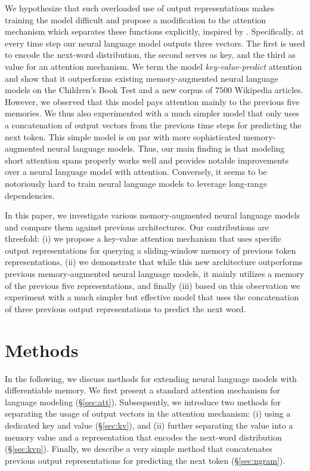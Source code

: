 \documentclass{article}
\begin{document}
We hypothesize that such overloaded use of output representations makes training the model difficult and propose a modification to the attention mechanism which separates these functions explicitly, inspired by \cite{MIL16, ba2016using, reed2015neural, gulcehre2016dynamic}.
Specifically, at every time step our neural language model outputs three vectors.
The first is used to encode the next-word distribution, the second serves as key, and the third as value for an attention mechanism.
We term the model \emph{key-value-predict} attention and show that it outperforms existing memory-augmented neural language models on the Children's Book Test \citep[CBT,][]{hill2015goldilocks} and a new corpus of $7500$ Wikipedia articles.
However, we observed that this model pays attention mainly to the previous five memories.
We thus also experimented with a much simpler model that only uses a concatenation of output vectors from the previous time steps for predicting the next token. 
This simple model is on par with more sophisticated memory-augmented neural language models.
Thus, our main finding is that modeling short attention spans properly works well and provides notable improvements over a neural language model with attention.
Conversely, it seems to be notoriously hard to train neural language models to leverage long-range dependencies.

In this paper, we investigate various memory-augmented neural language models and compare them against previous architectures.
Our contributions are threefold:
(i) we propose a key-value attention mechanism that uses specific output representations for querying a sliding-window memory of previous token representations,
(ii) we demonstrate that while this new architecture outperforms previous memory-augmented neural language models, it mainly utilizes a memory of the previous five representations,
and finally (iii) based on this observation we experiment with a much simpler but effective model that uses the concatenation of three previous output representations to predict the next word.










\section{Methods}
In the following, we discuss methods for extending neural language models with differentiable memory.
We first present a standard attention mechanism for language modeling (\S\ref{sec:att}).
Subsequently, we introduce two methods for separating the usage of output vectors in the attention mechanism: (i) using a dedicated key and value (\S\ref{sec:kv}), and (ii) further separating the value into a memory value and a representation that encodes the next-word distribution (\S\ref{sec:kvp}). 
Finally, we describe a very simple method that concatenates previous output representations for predicting the next token (\S\ref{sec:ngram}).
\end{document}
